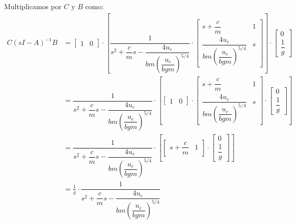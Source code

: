 Multiplicamos por $C$ y $B$ como:
\begin{align*}
    C(sI - A)^{-1}B 
        &=
        \begin{bmatrix} 1 & 0 \end{bmatrix} 
        \cdot 
        \left[ 
            \dfrac{1}{s^2 + \dfrac{c}{m}s - \dfrac{4u_{e}}{bm \left( \dfrac{u_{e}}{bgm} \right)^{5/4}}}
            \cdot 
           \begin{bmatrix}
                s + \dfrac{c}{m} & 1 \\[2ex]
                \dfrac{4u_{e}}{bm \left( \dfrac{u_{e}}{bgm} \right)^{5/4}} & s
           \end{bmatrix}
        \right]
        \cdot 
        \begin{bmatrix} 0 \\[2ex] \dfrac{1}{g} \end{bmatrix} \\[1em]
        &= 
            \dfrac{1}{s^2 + \dfrac{c}{m}s - \dfrac{4u_{e}}{bm \left( \dfrac{u_{e}}{bgm} \right)^{5/4}}} 
            \cdot
            \left[
                \begin{bmatrix} 1 & 0 \end{bmatrix}
                \cdot
               \begin{bmatrix}
                s + \dfrac{c}{m} & 1 \\[2ex]
                \dfrac{4u_{e}}{bm \left( \dfrac{u_{e}}{bgm} \right)^{5/4}} & s
               \end{bmatrix}
            \cdot
                \begin{bmatrix} 0 \\[2ex] \dfrac{1}{g} \end{bmatrix}
            \right] \\[1em]
        &= 
            \dfrac{1}{s^2 + \dfrac{c}{m}s - \dfrac{4u_{e}}{bm\left(\dfrac{u_{e}}{bgm}\right)^{5/4}}}
            \cdot 
            \left[
                \begin{bmatrix} s + \dfrac{c}{m} & 1 \end{bmatrix} 
                \cdot
                \begin{bmatrix} 0 \\[2ex]\dfrac{1}{g} \end{bmatrix}
            \right] \\[1em]
        &=  
            \frac{1}{g} 
            \cdot 
            \dfrac{1}{s^2 + \dfrac{c}{m}s - \dfrac{4u_{e}}{bm\left(\dfrac{u_{e}}{bgm}\right)^{5/4}}}
\end{align*}

